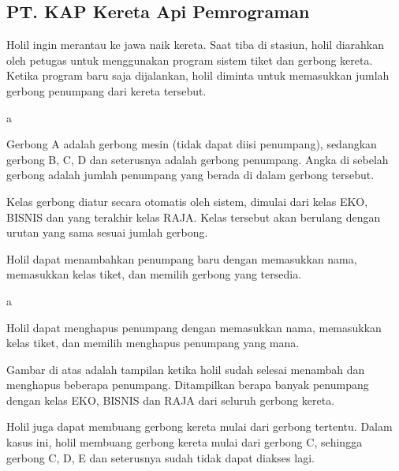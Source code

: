 \documentclass[../main.tex]{subfiles}
\begin{document}
    \subsection{PT. KAP Kereta Api Pemrograman}

    Holil ingin merantau ke jawa naik kereta. Saat tiba di stasiun, holil diarahkan oleh petugas untuk menggunakan program sistem tiket dan gerbong kereta. Ketika program baru saja dijalankan, holil diminta untuk memasukkan jumlah gerbong penumpang dari kereta tersebut.

    {\color{white}a\vspace*{-1.8ex}}

    Gerbong A adalah gerbong mesin (tidak dapat diisi penumpang), sedangkan gerbong B, C, D dan seterusnya adalah gerbong penumpang. Angka di sebelah gerbong adalah jumlah penumpang yang berada di dalam gerbong tersebut.


    Kelas gerbong diatur secara otomatis oleh sistem, dimulai dari kelas EKO, BISNIS dan yang terakhir kelas RAJA. Kelas tersebut akan berulang dengan urutan yang sama sesuai jumlah gerbong.
    

    Holil dapat menambahkan penumpang baru dengan memasukkan nama, memasukkan kelas tiket, dan memilih gerbong yang tersedia.

    {\color{white}a\vspace*{-1.5ex}}

    Holil dapat menghapus penumpang dengan memasukkan nama, memasukkan kelas tiket, dan memilih menghapus penumpang yang mana.


    Gambar di atas adalah tampilan ketika holil sudah selesai menambah dan menghapus beberapa penumpang. Ditampilkan berapa banyak penumpang dengan kelas EKO, BISNIS dan RAJA dari seluruh gerbong kereta.


    Holil juga dapat membuang gerbong kereta mulai dari gerbong tertentu. Dalam kasus ini, holil membuang gerbong kereta mulai dari gerbong C, sehingga gerbong C, D, E dan seterusnya sudah tidak dapat diakses lagi.
\end{document}
